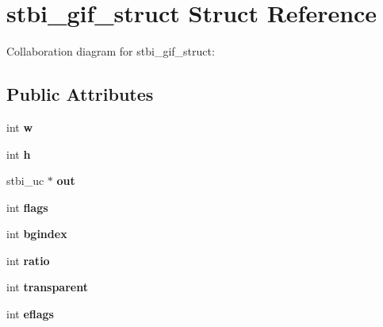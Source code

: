 \hypertarget{structstbi__gif__struct}{\section{stbi\+\_\+gif\+\_\+struct Struct Reference}
\label{structstbi__gif__struct}
}


Collaboration diagram for stbi\+\_\+gif\+\_\+struct\+:
\subsection*{Public Attributes}
\begin{DoxyCompactItemize}
\item 
\hypertarget{structstbi__gif__struct_a28e5c2fb704a64d23a7e8f9013ecda34}{int {\bfseries w}}\label{structstbi__gif__struct_a28e5c2fb704a64d23a7e8f9013ecda34}

\item 
\hypertarget{structstbi__gif__struct_a6ce6b990464cdbbe9a408fe26581b296}{int {\bfseries h}}\label{structstbi__gif__struct_a6ce6b990464cdbbe9a408fe26581b296}

\item 
\hypertarget{structstbi__gif__struct_a1c2d18ea92a86a416e7458cdaa9f4cc3}{stbi\+\_\+uc $\ast$ {\bfseries out}}\label{structstbi__gif__struct_a1c2d18ea92a86a416e7458cdaa9f4cc3}

\item 
\hypertarget{structstbi__gif__struct_a3d22eaa3fe69a1d35ff914add9bb6df5}{int {\bfseries flags}}\label{structstbi__gif__struct_a3d22eaa3fe69a1d35ff914add9bb6df5}

\item 
\hypertarget{structstbi__gif__struct_a0d3690bdbbf0b772d5369c0a29b77cc1}{int {\bfseries bgindex}}\label{structstbi__gif__struct_a0d3690bdbbf0b772d5369c0a29b77cc1}

\item 
\hypertarget{structstbi__gif__struct_ac082648ce87130679bcde2dd4651c530}{int {\bfseries ratio}}\label{structstbi__gif__struct_ac082648ce87130679bcde2dd4651c530}

\item 
\hypertarget{structstbi__gif__struct_ab46e0fb6ad50c3caeac8800ef07b78a8}{int {\bfseries transparent}}\label{structstbi__gif__struct_ab46e0fb6ad50c3caeac8800ef07b78a8}

\item 
\hypertarget{structstbi__gif__struct_aad9790350cb2d775722dc5d55fdfde42}{int {\bfseries eflags}}\label{structstbi__gif__struct_aad9790350cb2d775722dc5d55fdfde42}


\end{DoxyCompactItemize}
